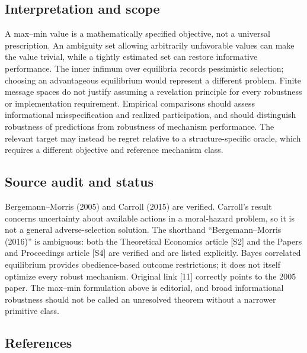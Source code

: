 \documentclass[11pt,a4paper]{article}
\begin{document}
\subsection*{Interpretation and scope}

A max--min value is a mathematically specified objective, not a universal prescription. An ambiguity set allowing arbitrarily unfavorable values can make the value trivial, while a tightly estimated set can restore informative performance. The inner infimum over equilibria records pessimistic selection; choosing an advantageous equilibrium would represent a different problem. Finite message spaces do not justify assuming a revelation principle for every robustness or implementation requirement. Empirical comparisons should assess informational misspecification and realized participation, and should distinguish robustness of predictions from robustness of mechanism performance. The relevant target may instead be regret relative to a structure-specific oracle, which requires a different objective and reference mechanism class.

\subsection*{Source audit and status}

Bergemann--Morris (2005) and Carroll (2015) are verified. Carroll's result concerns uncertainty about available actions in a moral-hazard problem, so it is not a general adverse-selection solution. The shorthand ``Bergemann--Morris (2016)'' is ambiguous: both the Theoretical Economics article [S2] and the Papers and Proceedings article [S4] are verified and are listed explicitly. Bayes correlated equilibrium provides obedience-based outcome restrictions; it does not itself optimize every robust mechanism. Original link [11] correctly points to the 2005 paper. The max--min formulation above is editorial, and broad informational robustness should not be called an unresolved theorem without a narrower primitive class.

\subsection*{References}
\end{document}
